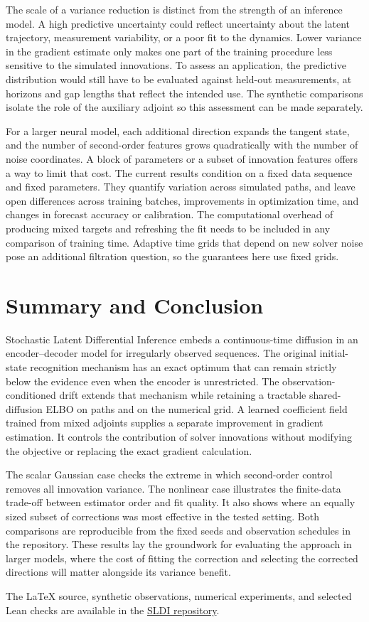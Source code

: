 \documentclass[12pt]{article}
\begin{document}
The scale of a variance reduction is distinct from the strength of an inference model. A high predictive uncertainty could reflect uncertainty about the latent trajectory, measurement variability, or a poor fit to the dynamics. Lower variance in the gradient estimate only makes one part of the training procedure less sensitive to the simulated innovations. To assess an application, the predictive distribution would still have to be evaluated against held-out measurements, at horizons and gap lengths that reflect the intended use. The synthetic comparisons isolate the role of the auxiliary adjoint so this assessment can be made separately.

For a larger neural model, each additional direction expands the tangent state, and the number of second-order features grows quadratically with the number of noise coordinates. A block of parameters or a subset of innovation features offers a way to limit that cost. The current results condition on a fixed data sequence and fixed parameters. They quantify variation across simulated paths, and leave open differences across training batches, improvements in optimization time, and changes in forecast accuracy or calibration. The computational overhead of producing mixed targets and refreshing the fit needs to be included in any comparison of training time. Adaptive time grids that depend on new solver noise pose an additional filtration question, so the guarantees here use fixed grids.

\section*{Summary and Conclusion}

Stochastic Latent Differential Inference embeds a continuous-time diffusion in an encoder--decoder model for irregularly observed sequences. The original initial-state recognition mechanism has an exact optimum that can remain strictly below the evidence even when the encoder is unrestricted. The observation-conditioned drift extends that mechanism while retaining a tractable shared-diffusion ELBO on paths and on the numerical grid. A learned coefficient field trained from mixed adjoints supplies a separate improvement in gradient estimation. It controls the contribution of solver innovations without modifying the objective or replacing the exact gradient calculation.

The scalar Gaussian case checks the extreme in which second-order control removes all innovation variance. The nonlinear case illustrates the finite-data trade-off between estimator order and fit quality. It also shows where an equally sized subset of corrections was most effective in the tested setting. Both comparisons are reproducible from the fixed seeds and observation schedules in the repository. These results lay the groundwork for evaluating the approach in larger models, where the cost of fitting the correction and selecting the corrected directions will matter alongside its variance benefit.

The LaTeX source, synthetic observations, numerical experiments, and selected Lean checks are available in the \href{https://github.com/jameskrice7/Stochastic-Deep-Learning}{SLDI repository}.



\end{document}
